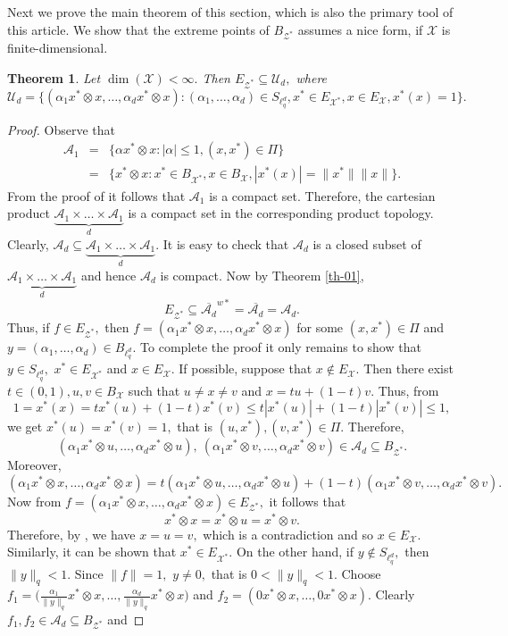 \documentclass{amsart}
\newtheorem{theorem}{Theorem}[section]
\theoremstyle{definition}
\theoremstyle{remark}
\numberwithin{equation}{section}
\begin{document}
 Next we prove the main theorem of this section, which is also the primary tool of this article. We show that the extreme points of $B_{\mathcal{Z}^*}$ assumes a nice form, if $\mathcal{X}$ is finite-dimensional. 
 \begin{theorem}\label{th-02}
 		Let $\dim(\mathcal{X})<\infty.$ Then $E_{\mathcal{Z}^*}\subseteq \mathcal{U}_d,$ where
 	\begin{equation*}
 	\mathcal{U}_d=	\{(\alpha_1x^*\otimes x,\ldots,\alpha_dx^*\otimes x):(\alpha_1,\ldots,\alpha_d)\in S_{\ell_q^d},x^*\in E_{\mathcal{X}^*},x\in E_{\mathcal{X}},x^*(x)=1\}.
 	\end{equation*} 
 \end{theorem}
 \begin{proof}
 	Observe that 
 	\begin{eqnarray*}
 	\mathcal{A}_1&=&\{\alpha x^*\otimes x:|\alpha|\leq 1,(x,x^*)\in \Pi\}\\
 	&=&\{x^*\otimes x:x^*\in B_{\mathcal{X}^*},x\in B_{\mathcal{X}},|x^*(x)|=\|x^*\|\|x\|\}.
 	\end{eqnarray*}
 From the proof of \cite[Th. 2.3]{M2} it follows that $\mathcal{A}_1$ is a compact set.  Therefore, the cartesian product $\underbrace{\mathcal{A}_1\times\ldots\times\mathcal{A}_1}_{d}$ is a compact set in the corresponding product topology. Clearly, $\mathcal{A}_d\subseteq \underbrace{\mathcal{A}_1\times\ldots\times\mathcal{A}_1}_{d}.$ It is easy to check that $\mathcal{A}_d$ is a closed subset of $ \underbrace{\mathcal{A}_1\times\ldots\times\mathcal{A}_1}_{d}$ and hence $\mathcal{A}_d$ is compact. Now by Theorem \ref{th-01}, 
 $$E_{\mathcal{Z}^*}\subseteq {\overline{\mathcal{A}_d}}^{w*}=\overline{\mathcal{A}_d}=\mathcal{A}_d.$$
Thus, if $f\in E_{\mathcal{Z}^*},$ then $f=(\alpha_1x^*\otimes x,\ldots, \alpha_dx^*\otimes x)$ for some $(x,x^*)\in \Pi$ and  $y=(\alpha_1,\ldots,\alpha_d)\in B_{\ell_q^d}.$  To complete the proof it only remains to show that $y\in S_{\ell_q^d},$ $x^*\in E_{{\mathcal{X}^*}}$ and $x\in E_{\mathcal{X}}.$ If possible, suppose that $x\notin E_{\mathcal{X}}.$ Then there exist $t\in (0,1), u,v\in B_{\mathcal{X}}$ such that $u\neq x\neq v$ and $x=tu+(1-t)v.$ Thus, from
 $$1=x^*(x)=tx^*(u)+(1-t)x^*(v)\leq t|x^*(u)|+(1-t)|x^*(v)|\leq 1,$$
 we get $x^*(u)=x^*(v)=1,$ that is $(u,x^*),(v,x^*)\in \Pi.$ Therefore, $$(\alpha_1x^*\otimes u,\ldots, \alpha_dx^*\otimes u), ~(\alpha_1x^*\otimes v,\ldots, \alpha_dx^*\otimes v)\in \mathcal{A}_d\subseteq B_{\mathcal{Z}^*}.$$ Moreover, 
 \[(\alpha_1x^*\otimes x,\ldots, \alpha_dx^*\otimes x)=t(\alpha_1x^*\otimes u,\ldots, \alpha_dx^*\otimes u)+(1-t)(\alpha_1x^*\otimes v,\ldots, \alpha_dx^*\otimes v).\] Now from $f=(\alpha_1x^*\otimes x,\ldots, \alpha_dx^*\otimes x)\in E_{\mathcal{Z}^*},$ it follows that $$x^*\otimes x=x^*\otimes u=x^*\otimes v.$$ Therefore, by \cite[Lem. 2.2]{M2},  we have $x=u=v,$ which is a contradiction and so $x\in E_{\mathcal{X}}.$ Similarly, it can be shown that $x^*\in E_{{\mathcal{X}}^*}.$ On the other hand, if $y\notin S_{\ell_q^d},$ then $\|y\|_q<1.$ Since $\|f\|=1,$ $y\neq 0,$ that is $0<\|y\|_q<1.$ Choose $f_1=\Big(\frac{\alpha_1}{\|y\|_q}x^*\otimes x,\ldots, \frac{\alpha_d}{\|y\|_q}x^*\otimes x\Big)$ and $f_2=(0x^*\otimes x,\ldots, 0x^*\otimes x).$ Clearly $f_1,f_2\in \mathcal{A}_d\subseteq B_{\mathcal{Z}^*}$ and

\end{proof}
\end{document}
